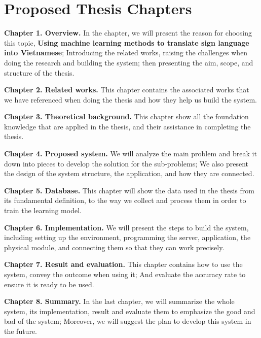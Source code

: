 \chapter{Proposed Thesis Chapters}

\textbf{Chapter 1. Overview.} In the chapter, we will present the reason for choosing this topic, \textbf{Using machine learning methods to translate sign language into Vietnamese}; Introducing the related works, raising the challenges when doing the research and building the system; then presenting the aim, scope, and structure of the thesis.

\textbf{Chapter 2. Related works.} This chapter contains the associated works that we have referenced when doing the thesis and how they help us build the system.

\textbf{Chapter 3. Theoretical background.} This chapter show all the foundation knowledge that are applied in the thesis, and their assistance in completing the thesis. 

\textbf{Chapter 4. Proposed system.} We will analyze the main problem and break it down into pieces to develop the solution for the sub-problems; We also present the design of the system structure, the application, and how they are connected.

\textbf{Chapter 5. Database.} This chapter will show the data used in the thesis from its fundamental definition, to the way we collect and process them in order to train the learning model.

\textbf{Chapter 6. Implementation.} We will present the steps to build the system, including setting up the environment, programming the server, application, the physical module, and connecting them so that they can work precisely.

\textbf{Chapter 7. Result and evaluation.} This chapter contains how to use the system, convey the outcome when using it; And evaluate the accuracy rate to ensure it is ready to be used.

\textbf{Chapter 8. Summary.} In the last chapter, we will summarize the whole system, its implementation, result and evaluate them to emphasize the good and bad of the system; Moreover, we will suggest the plan to develop this system in the future.
